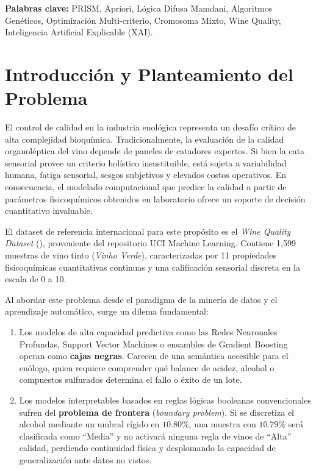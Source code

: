 \documentclass[11pt,a4paper]{article}
\begin{document}
\vspace{0.3cm}
\noindent\textbf{Palabras clave:} PRISM, Apriori, Lógica Difusa Mamdani, Algoritmos Genéticos, Optimización Multi-criterio, Cromosoma Mixto, Wine Quality, Inteligencia Artificial Explicable (XAI).

\vspace{0.4cm}

\section{Introducción y Planteamiento del Problema}

El control de calidad en la industria enológica representa un desafío crítico de alta complejidad bioquímica. Tradicionalmente, la evaluación de la calidad organoléptica del vino depende de paneles de catadores expertos. Si bien la cata sensorial provee un criterio holístico insustituible, está sujeta a variabilidad humana, fatiga sensorial, sesgos subjetivos y elevados costos operativos. En consecuencia, el modelado computacional que predice la calidad a partir de parámetros fisicoquímicos obtenidos en laboratorio ofrece un soporte de decisión cuantitativo invaluable.

El dataset de referencia internacional para este propósito es el \textit{Wine Quality Dataset} (\cite{cortez2009modeling}), proveniente del repositorio UCI Machine Learning. Contiene 1,599 muestras de vino tinto (\textit{Vinho Verde}), caracterizadas por 11 propiedades fisicoquímicas cuantitativas continuas y una calificación sensorial discreta en la escala de 0 a 10.

Al abordar este problema desde el paradigma de la minería de datos y el aprendizaje automático, surge un dilema fundamental:
\begin{enumerate}
    \item Los modelos de alta capacidad predictiva como las Redes Neuronales Profundas, Support Vector Machines o ensambles de Gradient Boosting operan como \textbf{cajas negras}. Carecen de una semántica accesible para el enólogo, quien requiere comprender qué balance de acidez, alcohol o compuestos sulfurados determina el fallo o éxito de un lote.
    \item Los modelos interpretables basados en reglas lógicas booleanas convencionales sufren del \textbf{problema de frontera} (\textit{boundary problem}). Si se discretiza el alcohol mediante un umbral rígido en $10.80\%$, una muestra con $10.79\%$ será clasificada como ``Media'' y no activará ninguna regla de vinos de ``Alta'' calidad, perdiendo continuidad física y desplomando la capacidad de generalización ante datos no vistos.
\end{enumerate}
\end{document}
